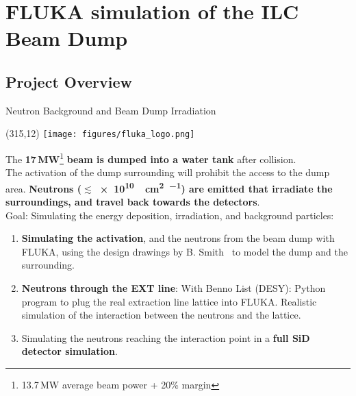 \documentclass[xcolor={dvipsnames}]{beamer}
\newcommand{\flukalogo}{
  \setlength{\TPHorizModule}{1pt}
  \setlength{\TPVertModule}{1pt}
  \begin{textblock}{1}(315,12)
   \texttt{[image: figures/fluka\_logo.png]}
  \end{textblock}
}
\begin{document}

\section{FLUKA simulation of the ILC Beam Dump}

\subsection{Project Overview}
{
\begin{frame}{Neutron Background and Beam Dump Irradiation}
\flukalogo
The \textbf{17\,MW}\footnote{13.7\,MW average beam power + 20\% margin} \textbf{beam is dumped into a water tank} after collision.\\The activation of the dump surrounding will prohibit the access to the dump area. \textbf{Neutrons ($\lesssim$\SI{e10}{\per\square\centi\metre\per\year}) are emitted that irradiate the surroundings, and travel back towards the detectors}.~\cite{SLAC_FLUKA}\\
\vspace*{0.1cm}
\alert{Goal: Simulating the energy deposition, irradiation, and background particles:}
\begin{enumerate}
 \item \textbf{Simulating the activation}, and the neutrons from the beam dump with FLUKA, using the design drawings by B. Smith~\cite{Smith} to model the dump and the surrounding.
 \item \textbf{Neutrons through the EXT line}: With Benno List (DESY): Python program to plug the real extraction line lattice into FLUKA. Realistic simulation of the interaction between the neutrons and the lattice.
 \item Simulating the neutrons reaching the interaction point in a \textbf{full SiD detector simulation}.
\end{enumerate}
\end{frame}
}
\end{document}
